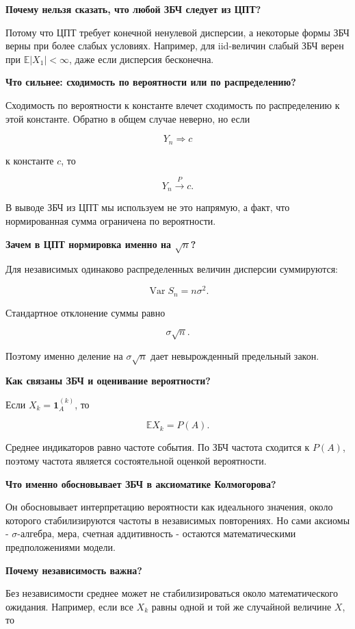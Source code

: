\documentclass[
  11pt,
  a4paper,
]{article}
\begin{document}
\textbf{Почему нельзя сказать, что любой ЗБЧ следует из ЦПТ?}

Потому что ЦПТ требует конечной ненулевой дисперсии, а некоторые формы
ЗБЧ верны при более слабых условиях. Например, для iid-величин слабый
ЗБЧ верен при \(\mathbb E|X_1|<\infty\), даже если дисперсия бесконечна.

\textbf{Что сильнее: сходимость по вероятности или по распределению?}

Сходимость по вероятности к константе влечет сходимость по распределению
к этой константе. Обратно в общем случае неверно, но если

\[
Y_n\Rightarrow c
\]

к константе \(c\), то

\[
Y_n\xrightarrow{P}c.
\]

В выводе ЗБЧ из ЦПТ мы используем не это напрямую, а факт, что
нормированная сумма ограничена по вероятности.

\textbf{Зачем в ЦПТ нормировка именно на \(\sqrt n\)?}

Для независимых одинаково распределенных величин дисперсии суммируются:

\[
\operatorname{Var}S_n=n\sigma^2.
\]

Стандартное отклонение суммы равно

\[
\sigma\sqrt n.
\]

Поэтому именно деление на \(\sigma\sqrt n\) дает невырожденный
предельный закон.

\textbf{Как связаны ЗБЧ и оценивание вероятности?}

Если \(X_k=\mathbf 1_A^{(k)}\), то

\[
\mathbb EX_k=P(A).
\]

Среднее индикаторов равно частоте события. По ЗБЧ частота сходится к
\(P(A)\), поэтому частота является состоятельной оценкой вероятности.

\textbf{Что именно обосновывает ЗБЧ в аксиоматике Колмогорова?}

Он обосновывает интерпретацию вероятности как идеального значения, около
которого стабилизируются частоты в независимых повторениях. Но сами
аксиомы - \(\sigma\)-алгебра, мера, счетная аддитивность - остаются
математическими предположениями модели.

\textbf{Почему независимость важна?}

Без независимости среднее может не стабилизироваться около
математического ожидания. Например, если все \(X_k\) равны одной и той
же случайной величине \(X\), то
\end{document}
